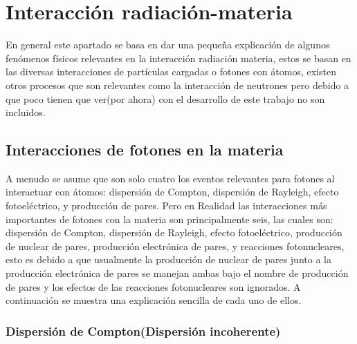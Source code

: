 
\clearpage

\section{Interacción radiación-materia}
\label{sec:INT}
En general este apartado se basa en dar una pequeña explicación de algunos fenómenos físicos relevantes en la interacción radiación materia, estos se basan en las diversas interacciones de partículas cargadas o fotones con átomos, existen otros procesos que son relevantes como la interacción de neutrones pero debido a que poco tienen que ver(por ahora) con el desarrollo de este trabajo no son incluidos.
\subsection{Interacciones de fotones en la materia}
 A menudo se asume que son solo cuatro los eventos relevantes para fotones al interactuar con átomos: dispersión de Compton, dispersión de Rayleigh, efecto fotoeléctrico, y producción de pares.
Pero en Realidad las interacciones más importantes de fotones con la materia son principalmente seis, las cuales son: dispersión de Compton, dispersión de Rayleigh, efecto fotoeléctrico, producción de nuclear de pares, producción electrónica de pares, y reacciones fotonucleares, esto es debido a que usualmente la producción de nuclear de pares junto a la producción electrónica de pares se manejan ambas bajo el nombre de producción de pares y los efectos de las reacciones fotonucleares son ignorados. A continuación se muestra una explicación sencilla de cada uno de ellos.

\subsubsection{Dispersión de Compton(Dispersión incoherente)}

